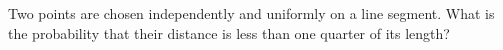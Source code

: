 Two points are chosen independently and uniformly on a line segment. What is the probability that their distance is less than one quarter of its length?
